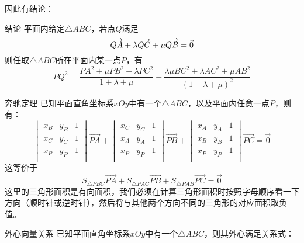 因此有结论：
\begin{conclusion}{结论}{}
    \noindent 平面内给定$\triangle{ABC}$，若点$Q$满足\vspace{-10pt}
    \[\overrightarrow{QA}+\lambda\overrightarrow{QC}+\mu\overrightarrow{QB}=\vec{0}\vspace{-10pt}\]则任取$\triangle{ABC}$所在平面内某一点$P$，有\[PQ^2=\dfrac{PA^2+\mu PB^2+\lambda PC^2}{1+\lambda+\mu}-\dfrac{\lambda\mu BC^2+\lambda AC^2+\mu AB^2}{\left(1+\lambda+\mu\right)^2}\]
\end{conclusion}
\begin{example}{奔驰定理}{}
    \noindent 已知平面直角坐标系$xOy$中有一个$\triangle{ABC}$，以及平面内任意一点$P$，则有：\[
    \begin{vmatrix}
    x_B & y_B & 1\\
    x_C & y_C & 1\\
    x_P & y_P & 1\\
\end{vmatrix}\overrightarrow{PA}+\begin{vmatrix}
    x_C & y_C & 1\\
    x_A & y_A & 1\\
    x_P & y_P & 1\\
\end{vmatrix}\overrightarrow{PB}+\begin{vmatrix}
    x_A & y_A & 1\\
    x_B & y_B & 1\\
    x_P & y_P & 1\\
\end{vmatrix}\overrightarrow{PC}=\vec{0}\]
这等价于\[S_{\triangle{PBC}}\overrightarrow{PA}+S_{\triangle{PAC}}\overrightarrow{PB}+S_{\triangle{PAB}}\overrightarrow{PC}=\vec{0}\]
这里的三角形面积是有向面积，我们必须在计算三角形面积时按照字母顺序看一下方向（顺时针或逆时针），然后将与其他两个方向不同的三角形的对应面积取负值。
\end{example}
\begin{solution}

\end{solution}
\begin{example}{外心向量关系}{}
    已知平面直角坐标系$xOy$中有一个$\triangle{ABC}$，则其外心满足关系式：
\end{example}
\begin{solution}

\end{solution}

